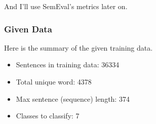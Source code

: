 And I'll use SemEval's metrics later on.

\subsubsection*{Given Data}

Here is the summary of the given training data.

\begin{itemize}
    \item Sentences in training data: 36334
    \item Total unique word: 4378
    \item Max sentence (sequence) length: 374
    \item Classes to classify: 7
\end{itemize}
